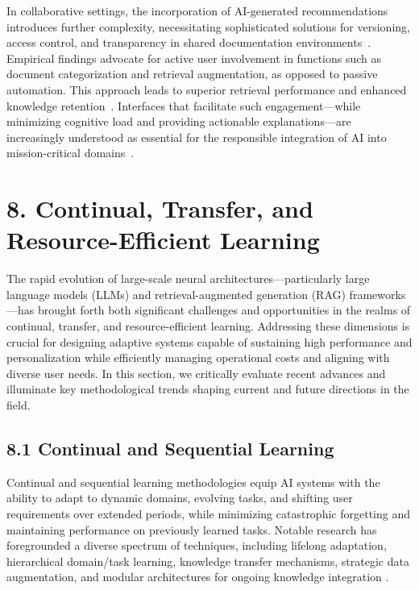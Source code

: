 \documentclass[11pt]{article}
\begin{document}
In collaborative settings, the incorporation of AI-generated recommendations introduces further complexity, necessitating sophisticated solutions for versioning, access control, and transparency in shared documentation environments~\cite{ref52, ref53, ref54}. Empirical findings advocate for active user involvement in functions such as document categorization and retrieval augmentation, as opposed to passive automation. This approach leads to superior retrieval performance and enhanced knowledge retention~\cite{ref54, ref55}. Interfaces that facilitate such engagement—while minimizing cognitive load and providing actionable explanations—are increasingly understood as essential for the responsible integration of AI into mission-critical domains~\cite{ref50, ref63, ref64}.

\section{8. Continual, Transfer, and Resource-Efficient Learning}

The rapid evolution of large-scale neural architectures—particularly large language models (LLMs) and retrieval-augmented generation (RAG) frameworks—has brought forth both significant challenges and opportunities in the realms of continual, transfer, and resource-efficient learning. Addressing these dimensions is crucial for designing adaptive systems capable of sustaining high performance and personalization while efficiently managing operational costs and aligning with diverse user needs. In this section, we critically evaluate recent advances and illuminate key methodological trends shaping current and future directions in the field.

\subsection{8.1 Continual and Sequential Learning}

Continual and sequential learning methodologies equip AI systems with the ability to adapt to dynamic domains, evolving tasks, and shifting user requirements over extended periods, while minimizing catastrophic forgetting and maintaining performance on previously learned tasks. Notable research has foregrounded a diverse spectrum of techniques, including lifelong adaptation, hierarchical domain/task learning, knowledge transfer mechanisms, strategic data augmentation, and modular architectures for ongoing knowledge integration \cite{ref7,ref18,ref19,ref20,ref21,ref22,ref23,ref24,ref26,ref29,ref30,ref46,ref54,ref55,ref61,ref62,ref64}.
\end{document}
